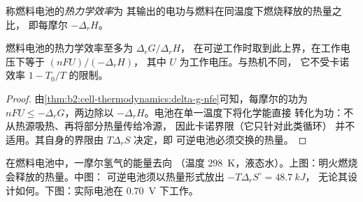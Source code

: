\begin{definition}[燃料电池的热力学效率]\label{def:b2:cell-thermodynamics:efficiency}
称燃料电池的\emph{热力学效率}为
其输出的电功与燃料在同温度下燃烧释放的热量之比，
即每摩尔 $-\Delta_r H$。
\end{definition}

\begin{proposition}[燃料电池的最大效率]\label{prop:b2:cell-thermodynamics:efficiency}
燃料电池的热力学效率至多为 $\Delta_r G/\Delta_r H$，
在可逆工作时取到此上界，在工作电压下等于 $(nFU)/(-\Delta_r H)$，
其中 $U$ 为工作电压。与热机不同，
它不受卡诺效率 $1 - T_0/T$ 的限制。
\end{proposition}

\begin{proof}
由\cref{thm:b2:cell-thermodynamics:delta-g-nfe}可知，每摩尔的功为 $nFU \leq
-\Delta_r G$，两边除以 $-\Delta_r H$。电池在单一温度下将化学能直接
转化为功：不从热源吸热、再将部分热量传给冷源，
因此卡诺界限（它只针对此类循环）
并不适用。其自身的界限由 $T\Delta_r S$ 决定，即
可逆电池必须交换的热量。
\end{proof}

\begin{omfigure}

{\small 在燃料电池中，一摩尔氢气的能量去向
（温度 \qty{298}{K}，液态水）。上图：明火燃烧会释放的热量。中图：
可逆电池须以热量形式放出 $-T\Delta_r S^\circ = \qty{48.7}{kJ}$，
无论其设计如何。下图：实际电池在 \qty{0.70}{V} 下工作。}
\end{omfigure}

